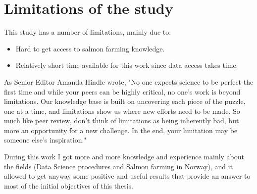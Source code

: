 \section{Limitations of the study}
\vspace{-5mm}
This study has a number of limitations, mainly due to:
\vspace{-5mm}
\begin{itemize}
 \setlength{\itemsep}{-5pt}
  \item Hard to get access to salmon farming knowledge.
  \item Relatively short time available for this work since data access takes time.
\end{itemize}

As Senior Editor Amanda Hindle wrote, "No one expects science to be perfect the first time and while your peers can be highly critical, no one’s work is beyond limitations. Our knowledge base is built on uncovering each piece of the puzzle, one at a time, and limitations show us where new efforts need to be made. So much like peer review, don’t think of limitations as being inherently bad, but more an opportunity for a new challenge. In the end, your limitation may be someone else’s inspiration." \cite{limitations}

During this work I got more and more knowledge and experience mainly about the fields (Data Science procedures and Salmon farming in Norway), and it allowed to get anyway some positive and useful results that provide an answer to most of the initial objectives of this thesis. \\
  
